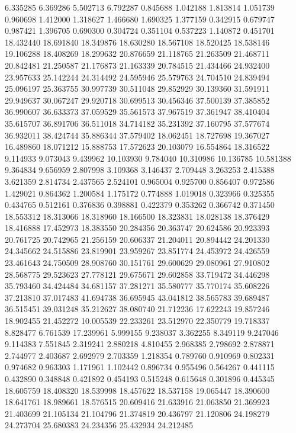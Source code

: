 6.335285
6.369286
5.502713
6.792287
0.845688
1.042188
1.813814
1.051739
0.960698
1.412000
1.318627
1.466680
1.690325
1.377159
0.342915
0.679747
0.987421
1.396705
0.690300
0.304724
0.351104
0.537223
1.140872
0.451701
18.432440
18.691840
18.349876
18.630280
18.567108
18.520425
18.538146
19.106288
18.408269
18.299632
20.876659
21.118765
21.263509
21.468711
20.842481
21.250587
21.176873
21.163339
20.784515
21.434466
24.932400
23.957633
25.142244
24.314492
24.595946
25.579763
24.704510
24.839494
25.096197
25.363755
30.997739
30.511048
29.852929
30.139360
31.591911
29.949637
30.067247
29.920718
30.699513
30.456346
37.500139
37.385852
36.990607
36.633373
37.059529
35.561573
37.967519
37.361947
38.410404
35.615707
36.891706
36.511018
34.714182
35.231392
37.160795
37.577674
36.932011
38.424744
35.886344
37.579402
18.062451
18.727698
19.367027
16.489860
18.071212
15.888753
17.572623
20.103079
16.554864
18.316522
9.114933
9.073043
9.439962
10.103930
9.784040
10.310986
10.136785
10.581388
9.364834
9.656959
2.807998
3.109368
3.146437
2.709448
3.263253
2.415388
3.621359
2.814734
2.437565
2.524101
0.965004
0.925700
0.856407
0.972586
1.429021
0.864362
1.200584
1.175172
0.774888
1.019018
0.323966
0.325355
0.434765
0.512161
0.376836
0.398881
0.422379
0.353262
0.366742
0.371450
18.553312
18.313066
18.318960
18.166500
18.323831
18.028138
18.376429
18.416888
17.452973
18.383550
20.284356
20.363747
20.624586
20.923393
20.761725
20.742965
21.256159
20.606337
21.204011
20.894442
24.201330
24.345662
24.515886
23.819901
23.959267
23.851774
24.453972
24.426559
23.461643
24.750509
28.908760
30.151761
29.600629
29.080961
27.910802
28.568775
29.523623
27.778121
29.675671
29.602858
33.719472
34.446298
35.793460
34.424484
34.681157
37.281271
35.580777
35.770174
35.608226
37.213810
37.017483
41.694738
36.695945
43.041812
38.565783
39.689487
36.515451
39.031248
35.212627
38.080740
21.712236
17.622243
19.857246
18.902455
21.452272
10.005539
22.233261
23.512970
22.350779
19.718337
8.828477
6.761539
17.239961
5.999155
9.238037
3.362255
8.349119
9.247046
9.114383
7.551845
2.319241
2.880218
4.810455
2.968385
2.798692
2.878871
2.744977
2.403687
2.692979
2.703359
1.218354
0.789760
0.910969
0.802331
0.974682
0.963303
1.171961
1.102442
0.896734
0.955496
0.564267
0.441115
0.432890
0.348848
0.421892
0.454193
0.515248
0.615648
0.301896
0.445345
18.605759
18.408320
18.539998
18.457622
18.537158
19.065447
18.390600
18.641761
18.989661
18.576515
20.609416
21.633916
21.063850
21.369923
21.403699
21.105134
21.104796
21.374819
20.436797
21.120806
24.198279
24.273704
25.680383
24.234356
25.432934
24.212485
